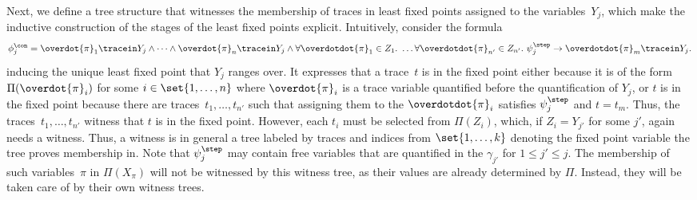 Next, we define a tree structure that witnesses the membership of traces in least fixed points assigned to the variables~$Y_j$, which make the inductive construction of the stages of the least fixed points explicit.
Intuitively, consider the formula
\begin{equation}
\label{eq_phicon}
\phi_j^\con = \overdot{\pi}_1\tracein Y_j \wedge \cdots \wedge \overdot{\pi}_n \tracein Y_j \wedge   \forall \overdotdot{\pi}_1 \in Z_1.\ \ldots \forall \overdotdot{\pi}_{n'} \in Z_{n'}.\ \psi^\step_j \rightarrow \overdotdot{\pi}_m \tracein Y_j.    
\end{equation}
inducing the unique least fixed point that $Y_j$ ranges over. 
It expresses that a trace~$t$ is in the fixed point either because it is of the form~$\Pi(\overdot{\pi}_i)$ for some $i \in \set{1,\ldots, n}$ where $\overdot{\pi}_i$ is a trace variable quantified before the quantification of $Y_j$, or $t$ is in the fixed point because there are traces~$t_1,\ldots, t_{n'}$ such that assigning them to the $\overdotdot{\pi}_i$ satisfies $\psi^\step_j$ and $t = t_m$. 
Thus, the traces~$t_1,\ldots, t_{n'}$ witness that $t$ is in the fixed point. 
However, each $t_i$ must be selected from $\Pi(Z_i)$, which, if $Z_i = Y_{j'}$ for some $j'$, again needs a witness.
Thus, a witness is in general a tree labeled by traces and indices from $\set{1, \ldots, k}$ denoting the fixed point variable the tree proves membership in.
Note that $\psi^\step_j$ may contain free variables that are quantified in the $\gamma_{j'}$ for $1 \le j' \le j$. 
The membership of such variables~$\pi$ in $\Pi(X_\pi)$ will not be witnessed by this witness tree, as their values are already determined by $\Pi$.
Instead, they will be taken care of by their own witness trees.

